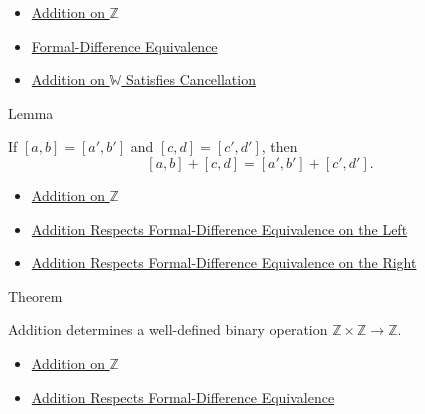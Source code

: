 \begin{dependencies}
\begin{itemize}
  \item \hyperref[def:addition-on-z-classes]{Addition on $\mathbb{Z}$}
  \item \hyperref[def:formal-difference-equivalence]{Formal-Difference Equivalence}
  \item \hyperref[thm:addition-on-w-cancellation]{Addition on $\mathbb{W}$ Satisfies Cancellation}
\end{itemize}
\end{dependencies}

\begin{lemmabox}{Lemma}
\begin{lemma}
\label{lem:addition-on-z-classes-respects-equivalence}
If $[a,b]=[a',b']$ and $[c,d]=[c',d']$, then
\[
[a,b]+[c,d]=[a',b']+[c',d'].
\]
\end{lemma}
\end{lemmabox}

\begin{dependencies}
\begin{itemize}
  \item \hyperref[def:addition-on-z-classes]{Addition on $\mathbb{Z}$}
  \item \hyperref[lem:addition-on-z-classes-respects-left-equivalence]{Addition Respects Formal-Difference Equivalence on the Left}
  \item \hyperref[lem:addition-on-z-classes-respects-right-equivalence]{Addition Respects Formal-Difference Equivalence on the Right}
\end{itemize}
\end{dependencies}

\begin{theorembox}{Theorem}
\begin{theorem}
\label{thm:addition-on-z-well-defined}
Addition determines a well-defined binary operation
$\mathbb{Z}\times\mathbb{Z}\to\mathbb{Z}$.
\end{theorem}
\end{theorembox}

\begin{dependencies}
\begin{itemize}
  \item \hyperref[def:addition-on-z-classes]{Addition on $\mathbb{Z}$}
  \item \hyperref[lem:addition-on-z-classes-respects-equivalence]{Addition Respects Formal-Difference Equivalence}
\end{itemize}
\end{dependencies}

